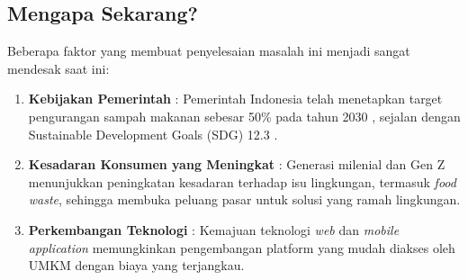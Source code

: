 \subsection{Mengapa Sekarang?}

Beberapa faktor yang membuat penyelesaian masalah ini menjadi sangat mendesak saat ini:

\begin{enumerate}[leftmargin=*]
    \item \textbf{Kebijakan Pemerintah} : Pemerintah Indonesia telah menetapkan target pengurangan sampah makanan sebesar 50\% pada tahun 2030 \cite{unsdg2024}, sejalan dengan Sustainable Development Goals (SDG) 12.3 \cite{fao2024state}.
    
    \item \textbf{Kesadaran Konsumen yang Meningkat} : Generasi milenial dan Gen Z menunjukkan peningkatan kesadaran terhadap isu lingkungan, termasuk \textit{food waste}, sehingga membuka peluang pasar untuk solusi yang ramah lingkungan.
    
    \item \textbf{Perkembangan Teknologi} : Kemajuan teknologi \textit{web} dan \textit{mobile application} memungkinkan pengembangan platform yang mudah diakses oleh UMKM dengan biaya yang terjangkau.
\end{enumerate}

